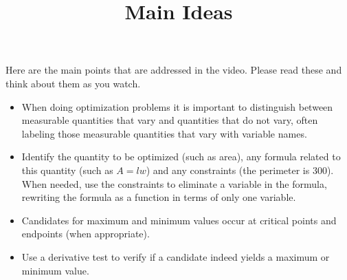 \documentclass[handout]{ximera}
\title{Main Ideas}
\begin{document}
\begin{abstract}
\end{abstract}

\maketitle

Here are the main points that are addressed in the video. Please read these and think about them as you watch.

\begin{itemize}
\item When doing optimization problems it is important to distinguish between measurable quantities that vary and quantities that do not vary, often labeling those measurable quantities that vary with variable names.
\item Identify the quantity to be optimized (such as area), any formula related to this quantity (such as $A=lw$) and any constraints (the perimeter is 300). When needed, use the constraints to eliminate a variable in the formula, rewriting the formula as a function in terms of only one variable.
\item Candidates for maximum and minimum values occur at critical points and endpoints (when appropriate).
\item Use a derivative test to verify if a candidate indeed yields a maximum or minimum value.
\end{itemize}
\end{document}
